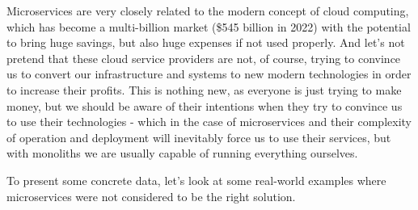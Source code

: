 Microservices are very closely related to the modern concept of cloud computing, which has become a multi-billion market (\$545 billion in 2022\cite{CC_MARKET_SIZE}) with the potential to bring huge savings, but also huge expenses if not used properly. And let's not pretend that these cloud service providers are not, of course, trying to convince us to convert our infrastructure and systems to new modern technologies in order to increase their profits. This is nothing new, as everyone is just trying to make money, but we should be aware of their intentions when they try to convince us to use their technologies - which in the case of microservices and their complexity of operation and deployment will inevitably force us to use their services, but with monoliths we are usually capable of running everything ourselves.

To present some concrete data, let's look at some real-world examples where microservices were not considered to be the right solution.

